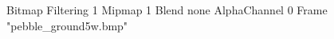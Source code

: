 {Bitmap
	{Filtering 1}
	{Mipmap 1}
	{Blend none}
	{AlphaChannel 0}
	{Frame "pebble_ground5w.bmp"}
}
